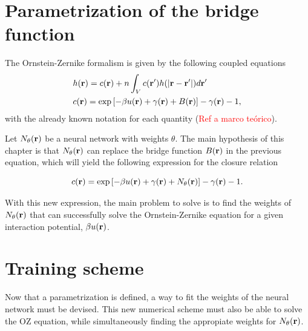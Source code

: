 \section{Parametrization of the bridge function}

The Ornstein-Zernike formalism is given by the following coupled equations~\cite{hansenTheorySimpleLiquids2013}
\begin{equation}
    \begin{aligned}
         & h(\mathbf{r}) = c(\mathbf{r}) +
        n \int_{V}
        c(\mathbf{r}^{\prime})
        h(\lvert \mathbf{r} - \mathbf{r}^{\prime} \rvert)
        d\mathbf{r}^{\prime} \\
         & c(\mathbf{r})
        = \exp{\left[
                -  \beta u(\mathbf{r})
                +  \gamma(\mathbf{r})
                + B(\mathbf{r})
                \right]} -
        \gamma(\mathbf{r})
        - 1 ,
    \end{aligned}
    \label{eq:oz1}
\end{equation}
with the already known notation for each quantity (\textcolor{red}{Ref a marco teórico}).

Let $N_{\theta}(\mathbf{r})$ be a neural network with weights $\theta$. The main hypothesis
of this chapter is that $N_{\theta}(\mathbf{r})$ can replace the bridge function $B(\mathbf{r})$
in the previous equation, which will yield the following expression for
the closure relation

\begin{equation}
    c(\mathbf{r}) = \exp{\left[
            -  \beta u(\mathbf{r})
            +  \gamma(\mathbf{r})
            + N_{\theta}(\mathbf{r})\right]} -
    \gamma(\mathbf{r})
    - 1 .
    \label{eq:parametrizacion}
\end{equation}

With this new expression, the main problem to solve is to find the weights
of $N_{\theta}(\mathbf{r})$ that can successfully solve the Ornstein-Zernike equation
for a given interaction potential, $\beta u(\mathbf{r})$.


\section{Training scheme}
Now that a parametrization is defined, a way to fit the weights of the neural network must
be devised. This new numerical scheme must also be able to solve the OZ equation, while
simultaneously finding the appropiate weights for $N_{\theta}(\mathbf{r})$.

